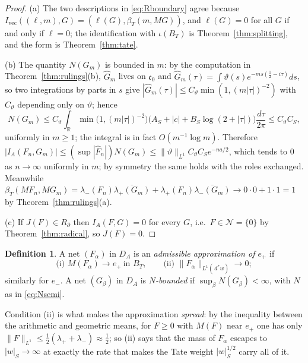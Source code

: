 \documentclass[11pt]{amsart}
\theoremstyle{definition}
\newtheorem{definition}[theorem]{Definition}
\theoremstyle{remark}
\newcommand{\R}{\mathbb R}
\newcommand{\dstar}{\,d^{*}}
\newcommand{\DA}{D_A}
\newcommand{\Nrad}{\mathcal N}
\newcommand{\BT}{B_T}
\begin{document}
\begin{proof}
(a)  The two descriptions in \eqref{eq:Rboundary} agree because
$I_{\mathrm{vec}}((\ell,m),G)=(\ell(G),\beta_T(m,MG))$, and $\ell(G)=0$ for all
$G$ if and only if $\ell=0$; the identification with $\iota(\BT)$ is
Theorem~\ref{thm:splitting}, and the form is Theorem~\ref{thm:tate}.

(b)  The quantity $N(G_m)$ is bounded in $m$: by the computation in
Theorem~\ref{thm:rulings}(b), $\widehat G_m$ lives on $\mathfrak c_0$ and
$\widehat G_m(\tau)=\int\vartheta(s)e^{-ms(\frac12-i\tau)}ds$, so two integrations
by parts in $s$ give $|\widehat G_m(\tau)|\le C_{\vartheta}\min(1,(m|\tau|)^{-2})$
with $C_{\vartheta}$ depending only on $\vartheta$; hence
\[
N(G_m)\le C_{\vartheta}\int_{\R}\min\bigl(1,(m|\tau|)^{-2}\bigr)
\bigl(A_S+|c|+B_S\log(2+|\tau|)\bigr)\frac{d\tau}{2\pi}\le C_{\vartheta}C_S ,
\]
uniformly in $m\ge1$; the integral is in fact $O(m^{-1}\log m)$.  Therefore
$|I_A(F_n,G_m)|\le(\sup|\widehat F_n|)N(G_m)\le\lVert\vartheta\rVert_{L^1}
C_{\vartheta}C_Se^{-na/2}$, which tends to $0$ as $n\to\infty$ uniformly in $m$; by
symmetry the same holds with the roles exchanged.  Meanwhile
$\beta_T(MF_n,MG_m)=\lambda_-(F_n)\overline{\lambda_+(G_m)}+
\lambda_+(F_n)\overline{\lambda_-(G_m)}\to0\cdot0+1\cdot1=1$ by
Theorem~\ref{thm:rulings}(a).

(c)  If $J(F)\in R_{\partial}$ then $I_A(F,G)=0$ for every $G$, i.e.\
$F\in\Nrad=\{0\}$ by Theorem~\ref{thm:radical}, so $J(F)=0$.
\end{proof}

\begin{definition}\label{def:admissible}
A net $(F_{\alpha})$ in $\DA$ is an \emph{admissible approximation of $e_+$} if
\begin{equation}\label{eq:admissible}
\text{(i) } M(F_{\alpha})\to e_+\ \text{in }\BT,\qquad
\text{(ii) } \lVert F_{\alpha}\rVert_{L^1(\dstar w)}\to0 ;
\end{equation}
similarly for $e_-$.  A net $(G_{\beta})$ in $\DA$ is \emph{$N$-bounded} if
$\sup_{\beta}N(G_{\beta})<\infty$, with $N$ as in \eqref{eq:Nsemi}.
\end{definition}

Condition (ii) is what makes the approximation \emph{spread}: by
the inequality between the arithmetic and geometric means, for $F\ge0$ with
$M(F)$ near $e_+$ one has only $\lVert F\rVert_{L^1}\le\tfrac12(\lambda_++
\lambda_-)\approx\tfrac12$; so (ii) says that the mass of $F_{\alpha}$ escapes
to $|w|_S\to\infty$ at exactly the rate that makes the Tate weight
$|w|_S^{1/2}$ carry all of it.
\end{document}
